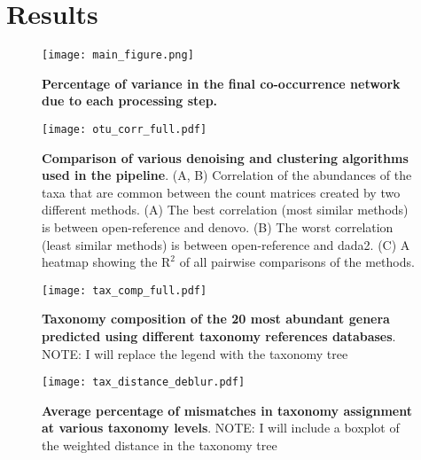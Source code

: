
\section*{Results}

  \begin{figure}[h]
    \begin{center}
      \texttt{[image: main\_figure.png]}
      \caption{\textbf{Percentage of variance in the final co-occurrence network due to each processing step.} }
      \label{fig:variance}
    \end{center}
  \end{figure}

  \begin{figure}[h]
    \begin{center}
      \texttt{[image: otu\_corr\_full.pdf]}
      \caption{
        \textbf{Comparison of various denoising and clustering algorithms used in the pipeline}.
        (A, B) Correlation of the abundances of the taxa that are common between the count matrices created by two different methods.
        (A) The best correlation (most similar methods) is between open-reference and denovo.
        (B) The worst correlation (least similar methods) is between open-reference and dada2.
        (C) A heatmap showing the $\mathrm{R}^2$ of all pairwise comparisons of the methods.
      }
      \label{fig:otu_correlations}
    \end{center}
  \end{figure}

  \begin{figure}[h]
    \begin{center}
      \texttt{[image: tax\_comp\_full.pdf]}
      \caption{\textbf{Taxonomy composition of the 20 most abundant genera predicted using different taxonomy references databases}. NOTE: I will replace the legend with the taxonomy tree}
      \label{fig:tax_comparison}
    \end{center}
  \end{figure}

  \begin{figure}[h]
    \begin{center}
      \texttt{[image: tax\_distance\_deblur.pdf]}
      \caption{\textbf{Average percentage of mismatches in taxonomy assignment at various taxonomy levels}. NOTE: I will include a boxplot of the weighted distance in the taxonomy tree}
      \label{fig:otu_correlations}
    \end{center}
  \end{figure}

